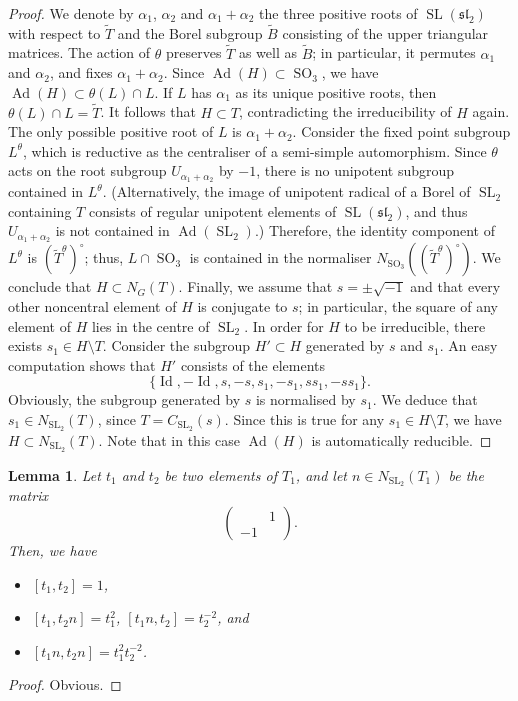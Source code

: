 \documentclass[11pt,oneside,dvipsnames]{amsart}
\theoremstyle{plain}
\newtheorem{Lem}[Thm]{Lemma}
\theoremstyle{definition}
\theoremstyle{named}
\DeclareMathOperator{\Ad}{Ad}
\DeclareMathOperator{\Id}{Id}
\DeclareMathOperator{\SL}{SL}
\DeclareMathOperator{\SO}{SO}
\begin{document}
\begin{proof}
We denote by $\alpha_1$, $\alpha_2$ and $\alpha_1+\alpha_2$ the three positive roots of $\SL(\mathfrak{sl}_2)$ with respect to $\tilde{T}$ and the Borel subgroup $\tilde{B}$ consisting of the upper triangular matrices. The action of $\theta$ preserves $\tilde{T}$ as well as $\tilde{B}$; in particular, it permutes $\alpha_1$ and $\alpha_2$, and fixes $\alpha_1+\alpha_2$. Since $\Ad(H)\subset\SO_3$, we have $\Ad(H)\subset \theta(L)\cap L$. If $L$ has $\alpha_1$ as its unique positive roots, then $\theta(L)\cap L=\tilde{T}$. It follows that $H\subset T$, contradicting the irreducibility of $H$ again. The only possible positive root of $L$ is $\alpha_1+\alpha_2$. Consider the fixed point subgroup $L^{\theta}$, which is reductive as the centraliser of a semi-simple automorphism. Since $\theta$ acts on the root subgroup $U_{\alpha_1+\alpha_2}$ by $-1$, there is no unipotent subgroup contained in $L^{\theta}$. (Alternatively, the image of unipotent radical of a Borel of $\SL_2$ containing $T$ consists of regular unipotent elements of $\SL(\mathfrak{sl}_2)$, and thus $U_{\alpha_1+\alpha_2}$ is not contained in $\Ad(\SL_2)$.) Therefore, the identity component of $L^{\theta}$ is $(\tilde{T}^{\theta})^{\circ}$; thus, $L\cap\SO_3$ is contained in the normaliser $N_{\SO_3}((\tilde{T}^{\theta})^{\circ})$. We conclude that $H\subset N_G(T)$. Finally, we assume that $s=\pm\sqrt{-1}$ and that every other noncentral element of $H$ is conjugate to $s$; in particular, the square of any element of $H$ lies in the centre of $\SL_2$. In order for $H$ to be irreducible, there exists $s_1\in H\setminus T$. Consider the subgroup $H'\subset H$ generated by $s$ and $s_1$. An easy computation shows that $H'$ consists of the elements
$$
\{\Id,-\Id,s,-s,s_1,-s_1,ss_1,-ss_1\}.
$$ 
Obviously, the subgroup generated by $s$ is normalised by $s_1$. We deduce that $s_1\in N_{\SL_2}(T)$, since $T=C_{\SL_2}(s)$. Since this is true for any $s_1\in H\setminus T$, we have $H\subset N_{\SL_2}(T)$. Note that in this case $\Ad(H)$ is automatically reducible.
\end{proof}


\begin{Lem}\label{Lem-[t_1,t_2]}
Let $t_1$ and $t_2$ be two elements of $T_1$, and let $n\in N_{\SL_2}(T_1)$ be the matrix
$$
\left(
\begin{array}{cc}
& 1\\
-1& 
\end{array}
\right).
$$ 
Then, we have
\begin{itemize}
\item[(i)] $[t_1,t_2]=1$,
\item[(ii)] $[t_1,t_2n]=t_1^2$, $[t_1n,t_2]=t_2^{-2}$, and
\item[(iii)] $[t_1n,t_2n]=t_1^2t_2^{-2}$.
\end{itemize}
\end{Lem}
\begin{proof}
Obvious.
\end{proof}
\end{document}
